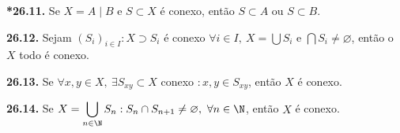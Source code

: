 

\begin{lemma}
    \textbf{*26.11.} Se \( X = A \mid B\) e \(S \subset X\) é conexo, então \(S \subset A\) ou \(S \subset B\). 
\end{lemma}

\hypertarget{prop2612}{}
\begin{proposition}
    \textbf{26.12.} Sejam \((S_i)_{i\in I} : X \supset S_i \) é conexo \(\forall i \in I,  \ X = \bigcup S_i\) e \(\bigcap S_i \neq \varnothing\), então o \(X\) todo é conexo.  
\end{proposition}

\begin{proposition}
    \textbf{26.13.} Se \(\forall x,y \in X, \ \exists S_{xy} \subset X \) conexo \(: x,y \in S_{xy}\), então \(X \) é conexo.  
\end{proposition}

\begin{proposition}
    \textbf{26.14.} Se \(X = \displaystyle\bigcup_{n\in \N} S_n : S_n \cap S_{n+1} \neq \varnothing, \ \forall n \in \N\), então \(X\) é conexo. %
\end{proposition}


